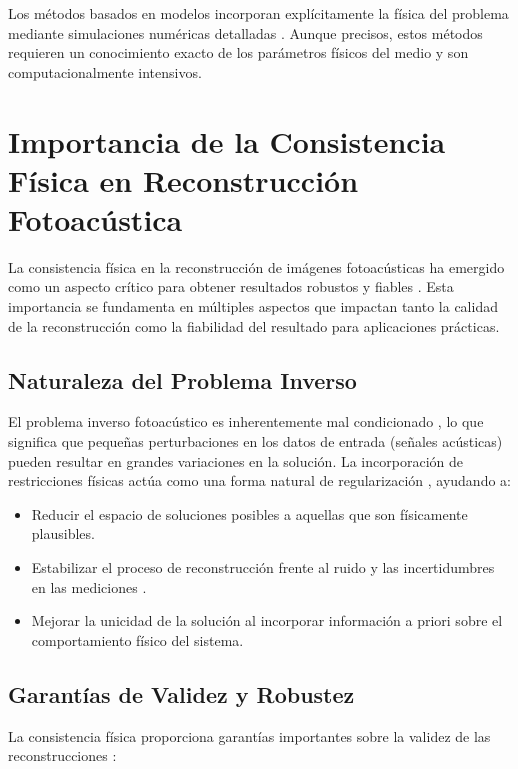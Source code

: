 Los métodos basados en modelos incorporan explícitamente la física del problema mediante simulaciones numéricas detalladas \cite{cox2009challenges}. Aunque precisos, estos métodos requieren un conocimiento exacto de los parámetros físicos del medio y son computacionalmente intensivos.

\section{Importancia de la Consistencia Física en Reconstrucción Fotoacústica}

La consistencia física en la reconstrucción de imágenes fotoacústicas ha emergido como un aspecto crítico para obtener resultados robustos y fiables \cite{hauptmann2018model}. Esta importancia se fundamenta en múltiples aspectos que impactan tanto la calidad de la reconstrucción como la fiabilidad del resultado para aplicaciones prácticas.


\subsection{Naturaleza del Problema Inverso}
El problema inverso fotoacústico es inherentemente mal condicionado \cite{wang2009inverse}, lo que significa que pequeñas perturbaciones en los datos de entrada (señales acústicas) pueden resultar en grandes variaciones en la solución. La incorporación de restricciones físicas actúa como una forma natural de regularización \cite{arridge2016solving}, ayudando a:

\begin{itemize}
    \item Reducir el espacio de soluciones posibles a aquellas que son físicamente plausibles.
    \item Estabilizar el proceso de reconstrucción frente al ruido y las incertidumbres en las mediciones \cite{antholzer2019deep}.
    \item Mejorar la unicidad de la solución al incorporar información a priori sobre el comportamiento físico del sistema.
\end{itemize}

\subsection{Garantías de Validez y Robustez}
La consistencia física proporciona garantías importantes sobre la validez de las reconstrucciones \cite{shan2019physics}:

